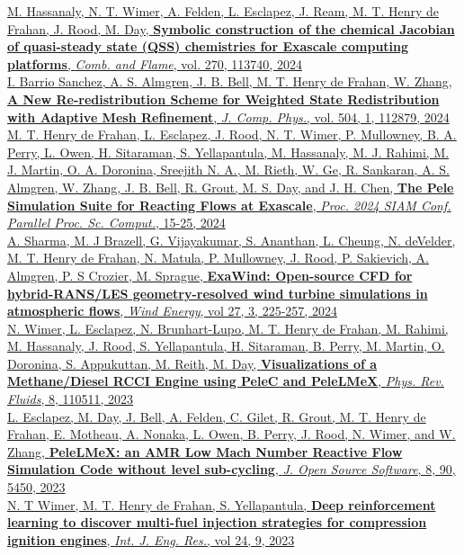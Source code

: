\documentclass[11pt,letterpaper]{article}
\begin{document}
\href{https://doi.org/10.1016/j.combustflame.2024.113740}{M. Hassanaly, N. T. Wimer, A. Felden, L. Esclapez, J. Ream, M. T. {Henry de Frahan}, J. Rood, M. Day, \textbf{Symbolic construction of the chemical Jacobian of quasi-steady state (QSS) chemistries for Exascale computing platforms}, \textit{Comb. and Flame}, vol. 270, 113740, 2024}\\[2ex]
\href{https://doi.org/10.1016/j.jcp.2024.112879}{I. Barrio Sanchez, A. S. Almgren, J. B. Bell, M. T. Henry de Frahan, W. Zhang, \textbf{A New Re-redistribution Scheme for Weighted State Redistribution with Adaptive Mesh Refinement}, \textit{J. Comp. Phys.}, vol. 504, 1, 112879, 2024}\\[2ex]
\href{https://doi.org/10.1137/1.9781611977967.2}{M. T. Henry de Frahan, L. Esclapez, J. Rood, N. T. Wimer, P. Mullowney, B. A. Perry, L. Owen, H. Sitaraman, S. Yellapantula, M. Hassanaly, M. J. Rahimi, M. J. Martin, O. A. Doronina, Sreejith N. A., M. Rieth, W. Ge, R. Sankaran, A. S. Almgren, W. Zhang, J. B. Bell, R. Grout, M. S. Day, and J. H. Chen, \textbf{The Pele Simulation Suite for Reacting Flows at Exascale}, \textit{Proc. 2024 SIAM Conf. Parallel Proc. Sc. Comput.}, 15-25, 2024}\\[2ex]
\href{https://doi.org/10.1002/we.2886}{A. Sharma, M. J Brazell, G. Vijayakumar, S. Ananthan, L. Cheung, N. deVelder, M. T. Henry de Frahan, N. Matula, P. Mullowney, J. Rood, P. Sakievich, A. Almgren, P. S Crozier, M. Sprague, \textbf{ExaWind: Open-source CFD for hybrid-RANS/LES geometry-resolved wind turbine simulations in atmospheric flows}, \textit{Wind Energy}, vol 27, 3, 225-257, 2024}\\[2ex]
\href{https://doi.org/10.1103/PhysRevFluids.8.110511}{N. Wimer, L. Esclapez, N. Brunhart-Lupo, M. T. Henry de Frahan, M. Rahimi, M. Hassanaly, J. Rood, S. Yellapantula, H. Sitaraman, B. Perry, M. Martin, O. Doronina, S. Appukuttan, M. Reith, M. Day, \textbf{Visualizations of a Methane/Diesel RCCI Engine using PeleC and PeleLMeX}, \textit{Phys. Rev. Fluids}, 8, 110511, 2023}\\[2ex]
\href{https://doi.org/10.21105/joss.05450}{L. Esclapez, M. Day, J. Bell, A. Felden, C. Gilet, R. Grout, M. T. Henry de Frahan, E. Motheau, A. Nonaka, L. Owen, B. Perry, J. Rood, N. Wimer, and W. Zhang, \textbf{PeleLMeX: an AMR Low Mach Number Reactive Flow Simulation Code without level sub-cycling}, \textit{J. Open Source Software}, 8, 90, 5450, 2023}\\[2ex]
\href{https://doi.org/10.1177/1468087423118400}{N. T Wimer, M. T. Henry de Frahan, S. Yellapantula, \textbf{Deep reinforcement learning to discover multi-fuel injection strategies for compression ignition engines}, \textit{Int. J. Eng. Res.}, vol 24, 9, 2023}\\[2ex]
\end{document}
